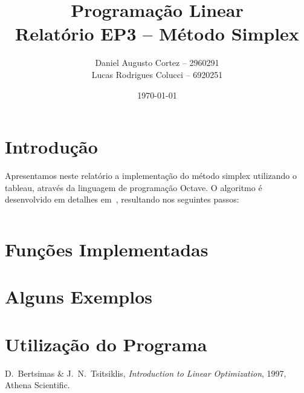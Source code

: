 \documentclass[12pt,a4paper]{article}
\newcommand{\zerar}{\setcounter{equation}{0}\setcounter{figure}{0}\setcounter{table}{0}}
\begin{document}
\title{Programação Linear \\ Relatório EP3 -- Método Simplex}
\author{Daniel Augusto Cortez -- 2960291 \\ Lucas Rodrigues Colucci -- 6920251}
\date{\today}

\maketitle


\zerar
\section{Introdução}
\label{sec:introducao}

Apresentamos neste relatório a implementação do método simplex utilizando o tableau, através da 
linguagem de programação Octave. O algoritmo é desenvolvido em detalhes em~\cite{bertsimas}, 
resultando nos seguintes passos:

\begin{verbatim}
\end{verbatim}


\zerar
\section{Funções Implementadas}
\label{sec:funcoes}


\zerar
\section{Alguns Exemplos}
\label{sec:exemplos}


\zerar
\section{Utilização do Programa}
\label{sec:programa}


\begin{thebibliography}{99}
	 D.~Bertsimas \& J.~N.~Tsitsiklis, {\it Introduction to Linear Optimization}, 
	1997, Athena Scientific.
\end{thebibliography}

\end{document}
